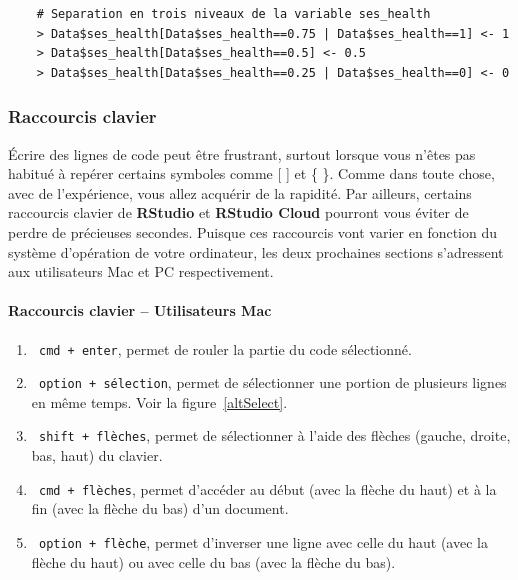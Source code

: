 \documentclass[10.5pt,a4paper]{article}
\newcommand{\rcode}[1]{\texttt{\color{rstudio} #1}}
\begin{document}
    \begin{lstlisting}
    # Separation en trois niveaux de la variable ses_health
    > Data$ses_health[Data$ses_health==0.75 | Data$ses_health==1] <- 1 
    > Data$ses_health[Data$ses_health==0.5] <- 0.5
    > Data$ses_health[Data$ses_health==0.25 | Data$ses_health==0] <- 0
    \end{lstlisting}
    
    \subsubsection{Raccourcis clavier}
    
   Écrire des lignes de code peut être frustrant, surtout lorsque vous n'êtes pas habitué à repérer certains symboles comme [ ] et \{ \}. Comme dans toute chose, avec de l'expérience, vous allez acquérir de la rapidité. Par ailleurs, certains raccourcis clavier de \textbf{RStudio} et \textbf{RStudio Cloud} pourront vous éviter de perdre de précieuses secondes. Puisque ces raccourcis vont varier en fonction du système d'opération de votre ordinateur, les deux prochaines sections s'adressent aux utilisateurs Mac et PC respectivement. 
    
      \paragraph{Raccourcis clavier -- Utilisateurs Mac}
      \begin{enumerate}
        \item \rcode{cmd + enter}, permet de rouler la partie du code sélectionné.
        \item \rcode{option + sélection}, permet de sélectionner une portion de plusieurs lignes en même temps. Voir la figure~\ref{altSelect}.
        \item \rcode{shift + flèches}, permet de sélectionner à l'aide des flèches (gauche, droite, bas, haut) du clavier.
        \item \rcode{cmd + flèches}, permet d'accéder au début (avec la flèche du haut) et à la fin (avec la flèche du bas) d'un document.
        \item \rcode{option + flèche}, permet d'inverser une ligne avec celle du haut (avec la flèche du haut) ou avec celle du bas (avec la flèche du bas).
      \end{enumerate}
      
\end{document}
